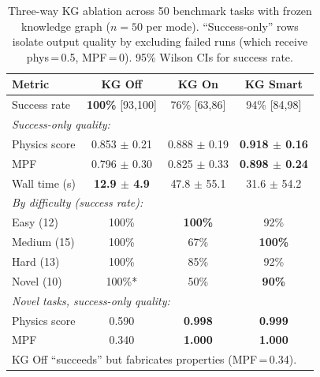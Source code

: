 \begin{table}[htbp]
\centering\footnotesize
\caption{Three-way KG ablation across 50 benchmark tasks with frozen
         knowledge graph ($n{=}50$ per mode).  ``Success-only'' rows isolate
         output quality by excluding failed runs (which receive
         phys\,=\,0.5, MPF\,=\,0).  95\% Wilson CIs for success rate.}
\label{tab:ablation}
\setlength{\tabcolsep}{4pt}
\begin{tabular}{lccc}
\toprule
Metric & KG Off & KG On & KG Smart \\
\midrule
  Success rate          & \textbf{100\%} [93,100] & 76\% [63,86] & 94\% [84,98]  \\[2pt]
\multicolumn{4}{l}{\textit{Success-only quality:}} \\
  \quad Physics score   & 0.853 $\pm$ 0.21 & 0.888 $\pm$ 0.19 & \textbf{0.918 $\pm$ 0.16} \\
  \quad MPF             & 0.796 $\pm$ 0.30 & 0.825 $\pm$ 0.33 & \textbf{0.898 $\pm$ 0.24} \\[2pt]
  Wall time (s)         & \textbf{12.9 $\pm$ 4.9} & 47.8 $\pm$ 55.1 & 31.6 $\pm$ 54.2 \\
\midrule
\multicolumn{4}{l}{\textit{By difficulty (success rate):}} \\
  \quad Easy (12)       & 100\%  & \textbf{100\%}  & 92\%  \\
  \quad Medium (15)     & 100\%  &  67\%  & \textbf{100\%} \\
  \quad Hard (13)       & 100\%  &  85\%  & 92\%  \\
  \quad Novel (10)      & 100\%* &  50\%  & \textbf{90\%}  \\
\midrule
\multicolumn{4}{l}{\textit{Novel tasks, success-only quality:}} \\
  \quad Physics score   & 0.590  & \textbf{0.998} & \textbf{0.999} \\
  \quad MPF             & 0.340  & \textbf{1.000} & \textbf{1.000} \\
\bottomrule
\multicolumn{4}{l}{\scriptsize *KG Off ``succeeds'' but fabricates properties (MPF\,=\,0.34).}\\
\end{tabular}
\end{table}
